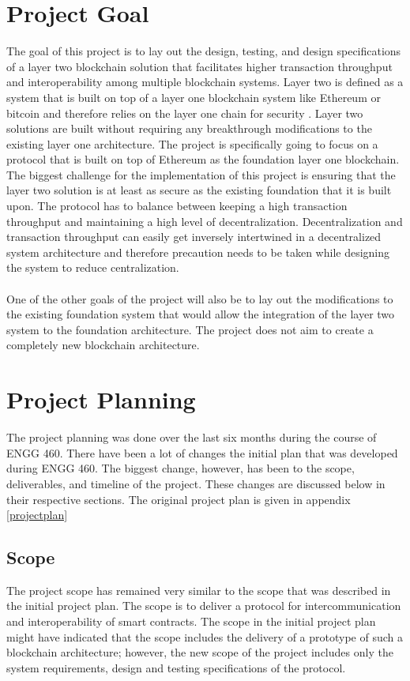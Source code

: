\documentclass[a4paper,twoside,phd]{BYUPhys}
\begin{document}
\section{Project Goal}
The goal of this project is to lay out the design, testing, and design specifications of a layer two blockchain solution that facilitates higher transaction throughput and interoperability among multiple blockchain systems. Layer two is defined as a system that is built on top of a layer one blockchain system like Ethereum or bitcoin and therefore relies on the layer one chain for security \cite{MichaelJCaseyLayerCoinDesk}. Layer two solutions are built without requiring any breakthrough modifications to the existing layer one architecture\cite{MichaelJCaseyLayerCoinDesk}. The project is specifically going to focus on a protocol that is built on top of Ethereum as the foundation layer one blockchain. The biggest challenge for the implementation of this project is ensuring that the layer two solution is at least as secure as the existing foundation that it is built upon. The protocol has to balance between keeping a high transaction throughput and maintaining a high level of decentralization. Decentralization and transaction throughput can easily get inversely intertwined in a decentralized system architecture and therefore precaution needs to be taken while designing the system to reduce centralization.
\\
\\ One of the other goals of the project will also be to lay out the modifications to the existing foundation system that would allow the integration of the layer two system to the foundation architecture. The project does not aim to create a completely new blockchain architecture.
\section{Project Planning}
The project planning was done over the last six months during the course of ENGG 460. There have been a lot of changes the initial plan that was developed during ENGG 460. The biggest change, however, has been to the scope, deliverables, and timeline of the project. These changes are discussed below in their respective sections. The original project plan is given in appendix \ref{projectplan}

\subsection{Scope}
The project scope has remained very similar to the scope that was described in the initial project plan. The scope is to deliver a protocol for intercommunication and interoperability of smart contracts. The scope in the initial project plan might have indicated that the scope includes the delivery of a prototype of such a blockchain architecture; however, the new scope of the project includes only the system requirements, design and testing specifications of the protocol. 
\end{document}
